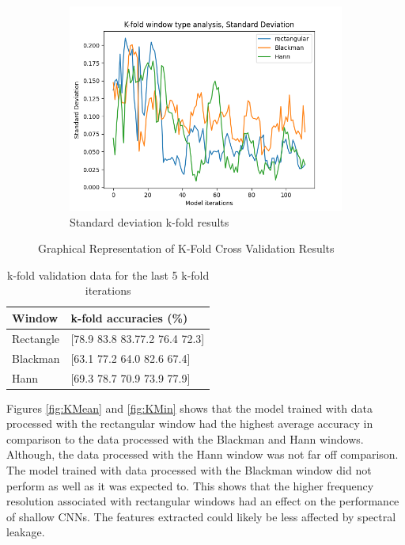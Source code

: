 \documentclass[class=report,11pt,crop=false]{standalone}
\begin{document}
\begin{figure}[ht]
\begin{subfigure}[b]{0.5\textwidth}
        \includegraphics[width=\linewidth]{Images/kfoldStandard Deviation.png}
        \caption{Standard deviation k-fold results}
        \label{fig:KStd}
    \end{subfigure}
    \caption{Graphical Representation of K-Fold Cross Validation Results}
    \label{fig:K-Fold}
\end{figure}
 
\begin{table}[h]
\centering
\begin{tabular}{|l|l|}
\hline
\textbf{Window} & \textbf{k-fold accuracies (\%)} \\
\hline
Rectangle & [78.9 83.8 83.77.2 76.4 72.3] \\
Blackman & [63.1 77.2 64.0 82.6 67.4] \\
Hann & [69.3 78.7 70.9 73.9 77.9] \\
\hline
\end{tabular}
\caption{k-fold validation data for the last 5 k-fold iterations}
\label{tab:k-fold-average}
\end{table}

Figures \ref{fig:KMean} and \ref{fig:KMin} shows that the model trained with data processed with the rectangular window had the highest average accuracy in comparison to the data processed with the Blackman and Hann windows. Although, the data processed with the Hann window was not far off comparison. The model trained with data processed with the Blackman window did not perform as well as it was expected to. This shows that the higher frequency resolution associated with rectangular windows had an effect on the performance of shallow CNNs. The features extracted could likely be less affected by spectral leakage. 
\end{document}
